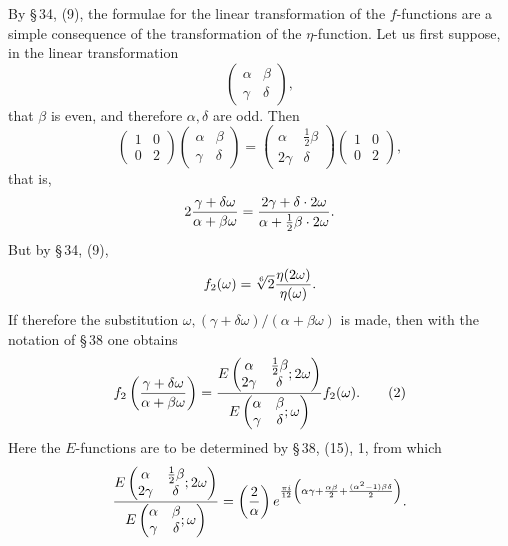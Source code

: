 \documentclass[11pt]{article}
\providecommand{\Jac}[2]{\left(\frac{#1}{#2}\right)}
\begin{document}
By \S\,34, (9), the formulae for the linear transformation of the $f$-functions are a simple consequence of the transformation of the $\eta$-function. Let us first suppose, in the linear transformation
\[
\begin{pmatrix}\alpha&\beta\\ \gamma&\delta\end{pmatrix},
\]
that $\beta$ is even, and therefore $\alpha,\delta$ are odd. Then
\begin{equation}
\begin{pmatrix}1&0\\0&2\end{pmatrix}
\begin{pmatrix}\alpha&\beta\\ \gamma&\delta\end{pmatrix}
=\begin{pmatrix}\alpha&\frac12\beta\\2\gamma&\delta\end{pmatrix}
\begin{pmatrix}1&0\\0&2\end{pmatrix},
\tag{1}
\end{equation}
that is,
\[
2{\gamma+
\delta\omega\over\alpha+
\beta\omega}
={2\gamma+
\delta\cdot2\omega\over\alpha+\frac12\beta\cdot2\omega}.
\]
But by \S\,34, (9),
\[
f_2(\omega)=\sqrt[6]{2}{\eta(2\omega)\over\eta(\omega)}.
\]
If therefore the substitution $\omega, (\gamma+
\delta\omega)/(\alpha+
\beta\omega)$ is made, then with the notation of \S\,38 one obtains
\begin{equation}
f_2\left({\gamma+
\delta\omega\over\alpha+
\beta\omega}\right)
={E\left(\begin{matrix}\alpha&\frac12\beta\\2\gamma&\delta\end{matrix};2\omega\right)
\over
E\left(\begin{matrix}\alpha&\beta\\\gamma&\delta\end{matrix};\omega\right)}f_2(\omega). 
\tag{2}
\end{equation}
Here the $E$-functions are to be determined by \S\,38, (15), 1, from which
\[
{E\left(\begin{matrix}\alpha&\frac12\beta\\2\gamma&\delta\end{matrix};2\omega\right)
\over
E\left(\begin{matrix}\alpha&\beta\\\gamma&\delta\end{matrix};\omega\right)}
=
\Jac{2}{\alpha}e^{{\pi i\over12}\left(\alpha\gamma+{\alpha\beta\over2}+{(\alpha^2-1)\beta\delta\over2}\right)}.
\]
\end{document}
